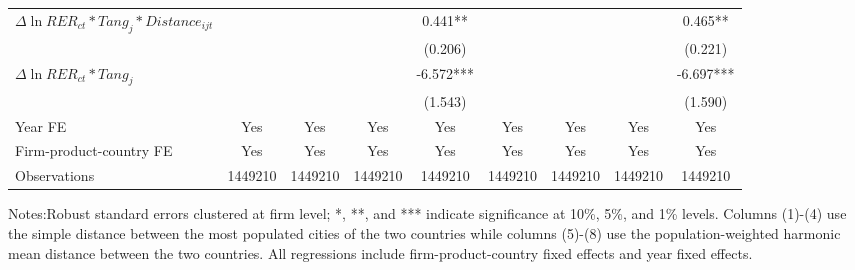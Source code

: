 \begin{table}
{\begin{threeparttable}
\begin{tabular}{lcccccccc}
				$\Delta \ln RER_{ct}*Tang_{j}*Distance_{ijt}$ &     &       &       & 0.441** &       &       &       & 0.465** \\
				&    &       &       & (0.206) &       &       &       & (0.221) \\
				$\Delta \ln RER_{ct}*Tang_{j}$ &    &       &       & -6.572*** &       &       &       & -6.697*** \\
				&     &       &       & (1.543) &       &       &       & (1.590) \\
				Year FE  & Yes   & Yes   & Yes   & Yes & Yes   & Yes   & Yes   & Yes\\
				Firm-product-country FE & Yes   & Yes   & Yes   & Yes & Yes   & Yes   & Yes   & Yes\\
				Observations & 1449210 & 1449210 & 1449210 & 1449210 & 1449210 & 1449210 & 1449210 & 1449210\\
				\bottomrule
			\end{tabular}
			\begin{tablenotes}
				\footnotesize
				\item Notes:Robust standard errors clustered at firm level; *, **, and *** indicate significance at 10\%, 5\%, and 1\% levels. Columns (1)-(4) use the simple distance between the most populated cities of the two countries while columns (5)-(8) use the population-weighted harmonic mean distance between the two countries. All regressions include firm-product-country fixed effects and year fixed effects.
			\end{tablenotes}
		\end{threeparttable}
	}
	\label{tab.source.distance}
\end{table}

